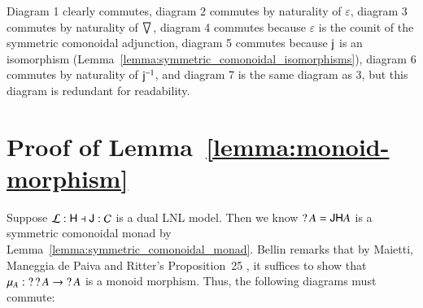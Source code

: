 Diagram 1 clearly commutes, diagram 2 commutes by naturality of
$\varepsilon$, diagram 3 commutes by naturality of $\bigtriangledown_{}$,
diagram 4 commutes because $\varepsilon$ is the counit of the
symmetric comonoidal adjunction, diagram 5 commutes because $\mathsf{j}_{}$
is an isomorphism
(Lemma~\ref{lemma:symmetric_comonoidal_isomorphisms}), diagram 6
commutes by naturality of $\mathsf{j}^{-1}_{}$, and diagram 7 is the same
diagram as 3, but this diagram is redundant for readability.

\section{Proof of Lemma~\ref{lemma:monoid-morphism}}
\label{sec:proof_of_lemma:monoid-morphism}
Suppose $\mathcal{L} : \mathsf{H} \dashv \mathsf{J} : \mathcal{C}$ is a dual LNL
model.  Then we know $\mathop{?} A = \mathsf{J}\mathsf{H} A$ is a symmetric comonoidal
monad by Lemma~\ref{lemma:symmetric_comonoidal_monad}.  Bellin
\cite{Bellin:2012} remarks that by Maietti, Maneggia de Paiva and
Ritter's Proposition~25 \cite{Maietti2005}, it suffices to show that
$\mu_A : \mathop{?}\mathop{?} A \rightarrow \mathop{?} A$ is a monoid morphism.  Thus, the
following diagrams must commute:
